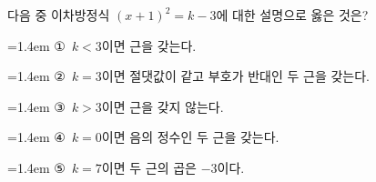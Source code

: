 다음 중 이차방정식 $(x+1)^2=k-3$에 대한 설명으로 옳은 것은?
\par\medskip\par\noindent\hangindent=1.4em {\small ①}\ $k<3$이면 근을 갖는다.\par\noindent\hangindent=1.4em {\small ②}\ $k=3$이면 절댓값이 같고 부호가 반대인 두 근을 갖는다.\par\noindent\hangindent=1.4em {\small ③}\ $k>3$이면 근을 갖지 않는다.\par\noindent\hangindent=1.4em {\small ④}\ $k=0$이면 음의 정수인 두 근을 갖는다.\par\noindent\hangindent=1.4em {\small ⑤}\ $k=7$이면 두 근의 곱은 $-3$이다.\par\medskip
